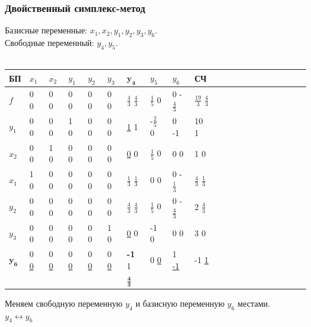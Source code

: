 \documentclass[14pt,a4paper,fleqn]{extarticle}
\begin{document}
	\subsubsection*{Двойственный симплекс-метод}
	Базисные переменные: $x_1, x_2, y_1, y_2, y_3, y_6$.\\
	Свободные переменный: $y_4, y_5$.\\\\
	\begin{tabularx}{\textwidth}{V{1}p{0.7cm}V{1}p{1.1cm}V{1}p{1.1cm}V{1}p{1.1cm}V{1}p{1.1cm}V{1}p{1.1cm}V{4}p{1.1cm}V{5}p{1.1cm}V{1}p{1.1cm}V{1}p{1.15cm}V{1}}
		\hline
		БП & $x_1$ & $x_2$ & $y_1$ & $y_2$ & $y_3$ & $\boldsymbol{y_4}$ & $y_5$ & $y_6$ & СЧ\\
		\hline
		$f$ & 0 \footnotesize 0 & 0 \footnotesize 0 & 0 \footnotesize 0 & 0 \footnotesize 0 & 0 \footnotesize 0 & \small \underline{$\frac{4}{3}$} \footnotesize $\frac{4}{3}$ & \small $\frac{1}{5}$ \footnotesize 0 & 0 \footnotesize -$\frac{4}{3}$ & \small $\frac{19}{3}$ \footnotesize $\frac{4}{3}$\\
		\hline
		$y_1$ & 0 \footnotesize 0 & 0 \footnotesize 0 & 1 \footnotesize 0 & 0 \footnotesize 0 & 0 \footnotesize 0 & \underline{1} \footnotesize 1 & \small -$\frac{2}{5}$ \footnotesize 0 & 0 \footnotesize -1 & 10 \footnotesize 1\\
		\hline
		$x_2$ & 0 \footnotesize 0 & 1 \footnotesize 0 & 0 \footnotesize 0 & 0 \footnotesize 0 & 0 \footnotesize 0 & \underline{0} \footnotesize 0 & \small $\frac{1}{5}$ \footnotesize 0 & 0 \footnotesize 0 & 1 \footnotesize 0\\
		\hline
		$x_1$ & 1 \footnotesize 0 & 0 \footnotesize 0 & 0 \footnotesize 0 & 0 \footnotesize 0 & 0 \footnotesize 0 & \small \underline{$\frac{1}{3}$} \footnotesize $\frac{1}{3}$ & 0 \footnotesize 0 & 0 \footnotesize -$\frac{1}{3}$ & \small $\frac{4}{3}$ \footnotesize $\frac{1}{3}$\\
		\hline
		$y_2$ & 0 \footnotesize 0 & 0 \footnotesize 0 & 0 \footnotesize 0 & 0 \footnotesize 0 & 0 \footnotesize 0 & \small \underline{$\frac{4}{3}$} \footnotesize $\frac{4}{3}$ & \small $\frac{1}{5}$ \footnotesize 0 & 0 \footnotesize -$\frac{4}{3}$ & 2 \footnotesize $\frac{4}{3}$\\
		\hline
		$y_3$ & 0 \footnotesize 0 & 0 \footnotesize 0 & 0 \footnotesize 0 & 0 \footnotesize 0 & 1 \footnotesize 0 & \underline{0} \footnotesize 0 & -1 \footnotesize 0 & 0 \footnotesize 0 & 3 \footnotesize 0\\
		\Xhline{4\arrayrulewidth}
		$\boldsymbol{y_6}$ & 0 \footnotesize \underline{0} & 0 \footnotesize \underline{0} & 0 \footnotesize \underline{0} & 0 \footnotesize \underline{0} & 0 \footnotesize \underline{0} & \textbf{-1} \footnotesize 1 & 0 \footnotesize \underline{0} & 1 \footnotesize \underline{-1} & -1 \footnotesize \underline{1}\\
		\Xhline{4\arrayrulewidth}
		& & & & & & $\boldsymbol{\frac{4}{3}}$& & & \\
	\end{tabularx}
	\newline\newline
	Меняем свободную переменную $y_4$ и базисную переменную $y_6$ местами.\\
	$y_4 \leftrightarrow y_6$
	\newpage
\end{document}
